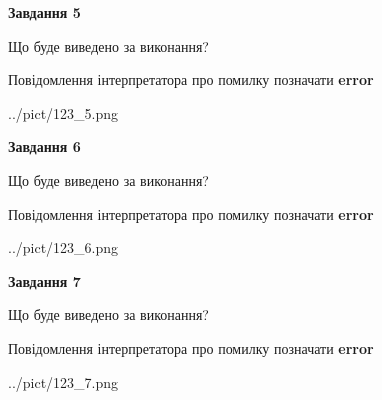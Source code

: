 \documentclass[10pt, ukrainian]{article}
\begin{document}
{\begin {large}
{\begin {center}\textbf{Завдання 5}\end {center}}\par
Що буде виведено за виконання? \par
Повідомлення інтерпретатора про помилку позначати \textbf{error}

\begin{center}
	{../pict/123_5.png}
\end{center}
\newpage

{\begin {center}\textbf{Завдання 6}\end {center}}\par
Що буде виведено за виконання? \par
Повідомлення інтерпретатора про помилку позначати \textbf{error}

\begin{center}
	{../pict/123_6.png}
\end{center}
\newpage

{\begin {center}\textbf{Завдання 7}\end {center}}\par
Що буде виведено за виконання? \par
Повідомлення інтерпретатора про помилку позначати \textbf{error}

\begin{center}
	{../pict/123_7.png}
\end{center}
\newpage

\end {large}}
\end{document}
